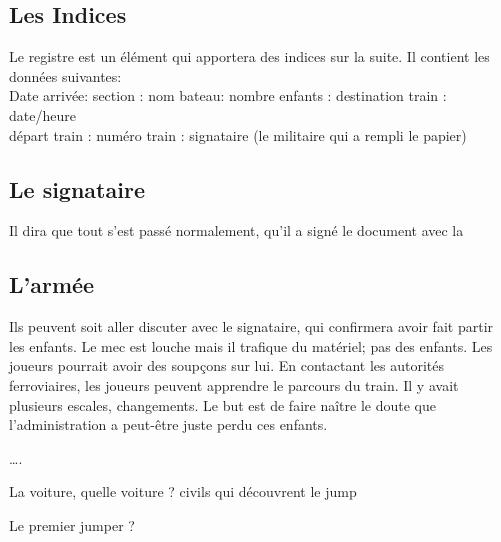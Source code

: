 \documentclass[oneside,12pt]{book}
\begin{document}
\begin{flushleft}
\subsection{Les Indices}
Le registre est un élément qui apportera des indices sur la suite. 
Il contient les données  suivantes:\\
Date arrivée: section : nom bateau: nombre enfants : destination train : date/heure \\
départ train : numéro train : signataire (le militaire qui a rempli le papier)\\

\subsection{Le signataire}
Il dira que tout s'est passé normalement, qu'il a signé le document avec la 

\subsection{L'armée}
Ils peuvent soit aller discuter avec le signataire, qui confirmera avoir fait partir les enfants. 
Le mec est louche mais il trafique du matériel; pas des enfants. 
Les joueurs pourrait avoir des soupçons sur lui.
En contactant les autorités ferroviaires, les joueurs peuvent apprendre le parcours du train.
Il y avait plusieurs escales, changements.
Le but est de faire naître le doute que l’administration a peut-être juste perdu ces enfants.

….





























La voiture, quelle voiture ?  
civils qui découvrent le jump






Le premier jumper ?



\end{flushleft}
\end{document}

